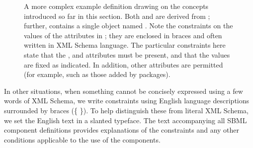 \begin{figure}[t]
  \centering
  \small
  
  \caption{A more complex example definition drawing on the
    concepts introduced so far in this section.  Both 
    and  are derived from ;
    further,  contains a single  object
    named .  Note the constraints on the values of
    the attributes in ; they are enclosed in braces
    and often written in XML Schema language.  The particular
    constraints here state that the , 
    and  attributes must be present, and that the
    values are fixed as indicated.  In addition, other attributes
    are permitted (for example, such as those added by \thisL
    packages).}
  \label{fig:unit-eg}
\end{figure}

In other situations, when something cannot be concisely expressed
using a few words of XML Schema, we write constraints using
English language descriptions surrounded by braces (\{ \}).  To
help distinguish these from literal XML Schema, we set the English
text in a slanted typeface.  The text accompanying all SBML
component definitions provides explanations of the constraints and
any other conditions applicable to the use of the components.


%
%
%
%

